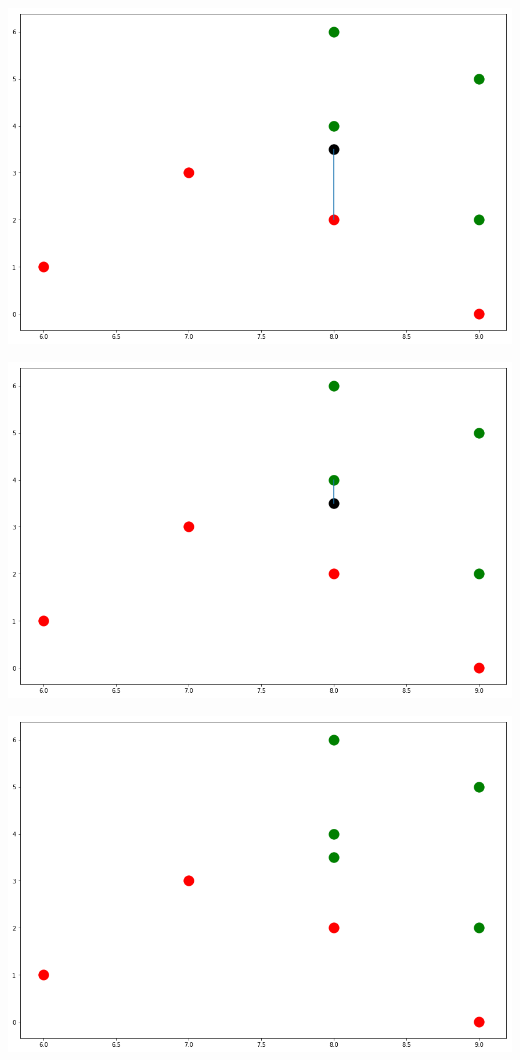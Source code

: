 \documentclass[a4paper]{scrartcl}
\begin{document}
\begin{multicols}{2}
                \includegraphics[width=\linewidth]{nn4.png}
                        
                \includegraphics[width=\linewidth]{nn5.png}
                        
                \includegraphics[width=\linewidth]{nn6.png}
                        

\end{multicols}
\end{document}
